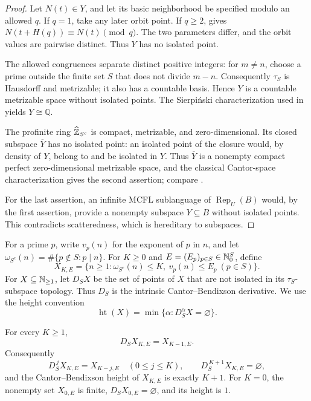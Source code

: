 \begin{proof}
  Let \(N(t)\in Y\), and let its basic neighborhood be specified modulo
  an allowed \(q\). If \(q=1\), take any later orbit point. If \(q\ge2\),
     gives
    \(N(t+H(q))\equiv N(t)\pmod q\). The two parameters differ, and the
    orbit values are pairwise distinct. Thus \(Y\) has no isolated point.

  The allowed congruences separate distinct positive integers: for
  \(m\ne n\), choose a prime outside the finite set \(S\) that does not
  divide \(m-n\). Consequently \(\tau_S\) is Hausdorff and metrizable;
  it also has a countable basis. Hence \(Y\) is a countable metrizable
  space without isolated points. The Sierpi\'nski characterization used
  in \cite[Theorem~2.4]{Broughan2003} yields \(Y\cong\mathbb Q\).

  The profinite ring \(\widehat{\mathbb{Z}}_{S^c}\) is compact, metrizable, and
  zero-dimensional. Its closed subspace \(\overline Y\) has no isolated
  point: an isolated point of the closure would, by density of \(Y\),
  belong to and be isolated in \(Y\). Thus \(\overline Y\) is a nonempty
  compact perfect zero-dimensional metrizable space, and the classical
  Cantor-space characterization gives the second assertion; compare
  \cite[Corollary~3.1]{Broughan2003}.

  For the last assertion, an infinite MCFL sublanguage of
  \(\operatorname{Rep}_U(B)\) would, by the first assertion, provide a
  nonempty subspace \(Y\subseteq B\) without isolated points. This
  contradicts scatteredness, which is hereditary to subspaces.
\end{proof}

For a prime \(p\), write \(v_p(n)\) for the exponent of \(p\) in \(n\),
and let \(\omega_{S^c}(n)=\#\{p\notin S:p\mid n\}\).
For \(K\ge0\) and \(E=(E_p)_{p\in S}\in\mathbb{N}_0^S\), define
\[
  X_{K,E}=\{n\ge1:\omega_{S^c}(n)\le K,
               \ v_p(n)\le E_p\ (p\in S)\}.
\]
For \(X\subseteq\mathbb{N}_{\ge1}\), let \(D_SX\) be the set of points of \(X\)
that are not isolated in its \(\tau_S\)-subspace topology. Thus \(D_S\)
is the intrinsic Cantor--Bendixson derivative. We use the height convention
\[
  \operatorname{ht}(X)=\min\{\alpha:D_S^\alpha X=\varnothing\}.
\]

\begin{proposition}
  \label{prop:local-prime-factor-cb-rank}
  For every \(K\ge1\),
  \[
    D_SX_{K,E}=X_{K-1,E}.
  \]
  Consequently
  \[
    D_S^{\,j}X_{K,E}=X_{K-j,E}\quad(0\le j\le K),
    \qquad D_S^{\,K+1}X_{K,E}=\varnothing,
  \]
  and the Cantor--Bendixson height of \(X_{K,E}\) is exactly \(K+1\).
  For \(K=0\), the nonempty set \(X_{0,E}\) is finite,
  \(D_SX_{0,E}=\varnothing\), and its height is \(1\).
\end{proposition}

